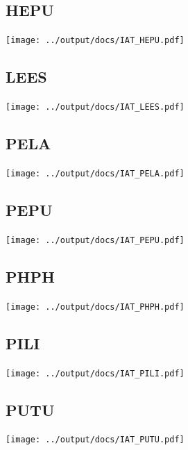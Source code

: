 \documentclass[10pt]{book} %
\begin{document}
\subsection{HEPU}
\texttt{[image: ../output/docs/IAT\_HEPU.pdf]}

\subsection{LEES}
\texttt{[image: ../output/docs/IAT\_LEES.pdf]}

\subsection{PELA}
\texttt{[image: ../output/docs/IAT\_PELA.pdf]}

\subsection{PEPU}
\texttt{[image: ../output/docs/IAT\_PEPU.pdf]}

\subsection{PHPH}
\texttt{[image: ../output/docs/IAT\_PHPH.pdf]}

\subsection{PILI}
\texttt{[image: ../output/docs/IAT\_PILI.pdf]}

\subsection{PUTU}
\texttt{[image: ../output/docs/IAT\_PUTU.pdf]}
\end{document}
